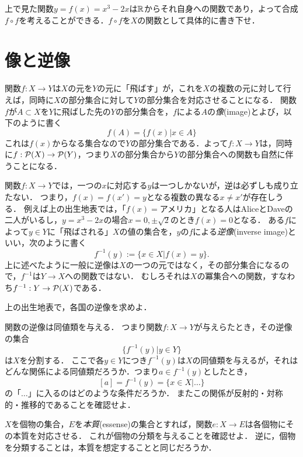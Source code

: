 \documentclass[11pt,a4paper]{jsarticle} %
\begin{document}
\begin{exercise}
上で見た関数$y = f(x) = x^3 -2x$は$\mathbb{R}$からそれ自身への関数であり，よって合成$f \circ f$を考えることができる．$f \circ f$を$X$の関数として具体的に書き下せ．
\end{exercise}



\section{像と逆像}

関数$f:X \to Y$は$X$の元を$Y$の元に「飛ばす」が，これを$X$の複数の元に対して行えば，同時に$X$の部分集合に対して$Y$の部分集合を対応させることになる．
関数$f$が$A \subset X$を$Y$に飛ばした先の$Y$の部分集合を，$f$による$A$の\emph{像}(image)とよび，以下のように書く
\[
 f(A) = \{f(x)|x \in A\} 
\]
これは$f(x)$からなる集合なので$Y$の部分集合である．よって$f:X \to Y$は，同時に$f:\mathcal{P}(X) \to \mathcal{P}(Y)$，つまり$X$の部分集合から$Y$の部分集合への関数も自然に伴うことになる．


関数$f:X \to Y$では，一つの$x$に対応する$y$は一つしかないが，逆は必ずしも成り立たない．
つまり，$f(x) = f(x') = y$となる複数の異なる$x \neq x'$が存在しうる．
例えば上の出生地表では，「$f(x)=\text{アメリカ}$」となる人はAliceとDaveの二人がいるし，$y=x^3-2x$の場合$x=0, \pm \sqrt{2}$のとき$f(x)=0$となる．
ある$f$によって$y \in Y$に「飛ばされる」$X$の値の集合を，$y$の$f$による\emph{逆像}(inverse image)といい，次のように書く
\[
f^{-1}(y) := \{ x \in X | f(x) = y\}.
\]
上に述べたように一般に逆像は$X$の一つの元ではなく，その部分集合になるので，$f^{-1}$は$Y \to X$への関数ではない．
むしろそれは$X$の冪集合への関数，すなわち$f^{-1}:Y \to \mathcal{P}(X)$である．

\begin{exercise}
 上の出生地表で，各国の逆像を求めよ．
\end{exercise}


\begin{exercise}
関数の逆像は同値類を与える．
つまり関数$f:X \to Y$が与えらたとき，その逆像の集合
\[
 \{f^{-1}(y) | y \in Y\}
\]
は$X$を分割する．
ここで各$y\in Y$につき$f^{-1}(y)$は$X$の同値類を与えるが，それはどんな関係による同値類だろうか．つまり$a \in f^{-1}(y)$としたとき，
\[
 [a] = f^{-1}(y) = \{x \in X |\dots \}
\]
の「$\dots$」に入るのはどのような条件だろうか．
またこの関係が反射的・対称的・推移的であることを確認せよ．
\end{exercise}

\begin{example}
\label{eg:essence}
$X$を個物の集合，$E$を\emph{本質}(essense)の集合とすれば，関数$e:X \to E$は各個物にその本質を対応させる．
これが個物の分類を与えることを確認せよ．
逆に，個物を分類することは，本質を想定することと同じだろうか．
\end{example}
\end{document}
